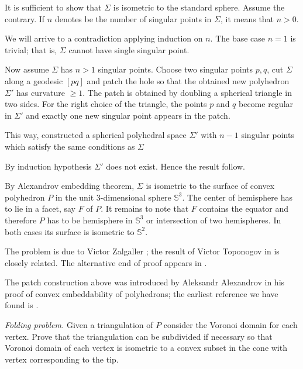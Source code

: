 It is sufficient to show that $\Sigma$ is isometric to the standard sphere.
Assume the contrary.
If $n$ denotes be the number of singular points in $\Sigma$, 
it means that $n>0$.

We will arrive to a contradiction applying induction on $n$.
The base case $n=1$ is trivial; 
that is, $\Sigma$ cannot have single singular point.

Now assume $\Sigma$ has $n>1$ singular points.
Choose two singular points $p, q$,
cut $\Sigma$ along a geodesic $[pq]$
and patch the hole so that the obtained new polyhedron $\Sigma'$ has curvature $\ge 1$.
The patch is obtained by doubling a
spherical triangle in two sides.
For the right choice of the triangle,
the points $p$ and $q$ become regular in $\Sigma'$
and exactly one new singular point appears in the patch.

This way, constructed a  spherical polyhedral space $\Sigma'$
with $n-1$ singular points which satisfy the same conditions as $\Sigma$ 

By induction hypothesis $\Sigma'$ does not exist. Hence the result follow.

By Alexandrov embedding theorem, $\Sigma$ is isometric to the surface of convex polyhedron $P$ in the unit 3-dimensional sphere $\mathbb S^3$. 
The center of hemisphere has to lie in a facet, say $F$ of $P$.
It remains to note that $F$ contains the equator and therefore $P$ has to be hemisphere in $\mathbb S^3$ or intersection of two hemispheres.
In both cases its surface is isometric to $\mathbb S^2$.

The problem is due to Victor Zalgaller \cite[see][]{zalgaller-shperical-polygon};
the result of Victor Toponogov in \cite{toponogov} is closely related.
The alternative end of proof appears in \cite{panov-petrunin}.

The patch construction above was introduced by 
Aleksandr Alexandrov
in his proof of convex embeddability of polyhedrons;
the earliest reference we have found is
\cite[VI, \S7]{alexandrov1948}.




\textit{Folding problem.}
Given a triangulation of $P$
consider the Voronoi domain for each vertex.
Prove that the triangulation can be subdivided if necessary
so that Voronoi domain of each vertex is isometric to a convex subset in the cone with vertex corresponding to the tip.

